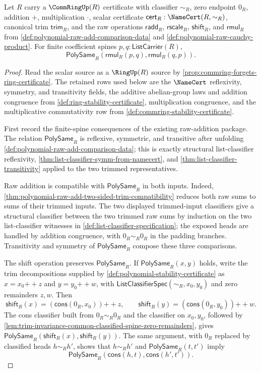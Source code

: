 \begin{theorem}
\label{thm:polynomial-raw-multiplication-commutativity-from-commring-scalars}
Let $R$ carry a $\CommRingUp(R)$ certificate with classifier $\sim_R$, zero endpoint $0_R$, addition $+$, multiplication $\cdot$, scalar certificate $\mathsf{cert}_R:\NameCert(R,\sim_R)$, canonical trim $\mathsf{trim}_R$, and the raw operations $\mathsf{radd}_R$, $\mathsf{rscale}_R$, $\mathsf{shift}_R$, and $\mathsf{rmul}_R$ from \autoref{def:polynomial-raw-add-comparison-data} and \autoref{def:polynomial-raw-cauchy-product}. For finite coefficient spines $p,q:\mathsf{ListCarrier}(R)$,
$$
\mathsf{PolySame}_R(\mathsf{rmul}_R(p,q),\mathsf{rmul}_R(q,p)).
$$
\end{theorem}
\begin{proof}
Read the scalar source as a $\RingUp(R)$ source by \autoref{prop:commring-forgets-ring-certificate}. The retained rows used below are the $\NameCert$ reflexivity, symmetry, and transitivity fields, the additive abelian-group laws and addition congruence from \autoref{def:ring-stability-certificate}, multiplication congruence, and the multiplicative commutativity row from \autoref{def:commring-stability-certificate}.

First record the finite-spine consequences of the existing raw-addition package. The relation $\mathsf{PolySame}_R$ is reflexive, symmetric, and transitive after unfolding \autoref{def:polynomial-raw-add-comparison-data}; this is exactly structural list-classifier reflexivity, \autoref{thm:list-classifier-symm-from-namecert}, and \autoref{thm:list-classifier-transitivity} applied to the two trimmed representatives.

Raw addition is compatible with $\mathsf{PolySame}_R$ in both inputs. Indeed, \autoref{thm:polynomial-raw-add-two-sided-trim-compatibility} reduces both raw sums to sums of their trimmed inputs. The two displayed trimmed-input classifiers give a structural classifier between the two trimmed raw sums by induction on the two list-classifier witnesses in \autoref{def:list-classifier-specification}; the exposed heads are handled by addition congruence, with $0_R\sim_R0_R$ in the padding branches. Transitivity and symmetry of $\mathsf{PolySame}_R$ compose these three comparisons.

The shift operation preserves $\mathsf{PolySame}_R$. If $\mathsf{PolySame}_R(x,y)$ holds, write the trim decompositions supplied by \autoref{def:polynomial-stability-certificate} as $x=x_0{++}z$ and $y=y_0{++}w$, with $\mathsf{ListClassifierSpec}(\sim_R,x_0,y_0)$ and zero remainders $z,w$. Then
$$
\mathsf{shift}_R(x)=(\mathsf{cons}(0_R,x_0)){++}z,
\qquad
\mathsf{shift}_R(y)=(\mathsf{cons}(0_R,y_0)){++}w.
$$
The cons classifier built from $0_R\sim_R0_R$ and the classifier on $x_0,y_0$, followed by \autoref{lem:trim-invariance-common-classified-spine-zero-remainders}, gives $\mathsf{PolySame}_R(\mathsf{shift}_R(x),\mathsf{shift}_R(y))$. The same argument, with $0_R$ replaced by classified heads $h\sim_Rh'$, shows that $h\sim_Rh'$ and $\mathsf{PolySame}_R(t,t')$ imply
$$
\mathsf{PolySame}_R(\mathsf{cons}(h,t),\mathsf{cons}(h',t')).
$$


\end{proof}

